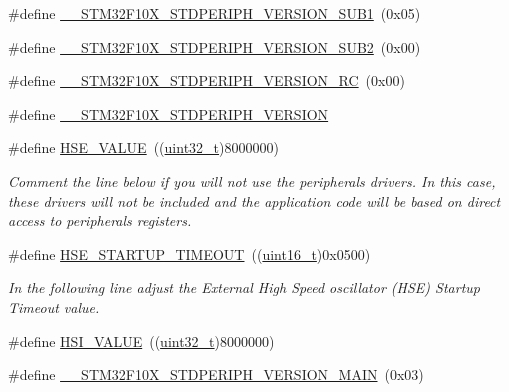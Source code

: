 \begin{DoxyCompactItemize}
\#define \hyperlink{group___library__configuration__section_ga7ce69a7c755b9d0551e9755d28612cb0}{\+\_\+\+\_\+\+S\+T\+M32\+F10\+X\+\_\+\+S\+T\+D\+P\+E\+R\+I\+P\+H\+\_\+\+V\+E\+R\+S\+I\+O\+N\+\_\+\+S\+U\+B1}~(0x05)
\item 
\#define \hyperlink{group___library__configuration__section_ga3ec41777ab08436b801c9c295248a6c7}{\+\_\+\+\_\+\+S\+T\+M32\+F10\+X\+\_\+\+S\+T\+D\+P\+E\+R\+I\+P\+H\+\_\+\+V\+E\+R\+S\+I\+O\+N\+\_\+\+S\+U\+B2}~(0x00)
\item 
\#define \hyperlink{group___library__configuration__section_gae0abedef178fde6294fdfd3401ef6e2c}{\+\_\+\+\_\+\+S\+T\+M32\+F10\+X\+\_\+\+S\+T\+D\+P\+E\+R\+I\+P\+H\+\_\+\+V\+E\+R\+S\+I\+O\+N\+\_\+\+RC}~(0x00)
\item 
\#define \hyperlink{group___library__configuration__section_gafb19c8675ea01accc2f8e5f467827328}{\+\_\+\+\_\+\+S\+T\+M32\+F10\+X\+\_\+\+S\+T\+D\+P\+E\+R\+I\+P\+H\+\_\+\+V\+E\+R\+S\+I\+ON}
\item 
\#define \hyperlink{group___library__configuration__section_gaeafcff4f57440c60e64812dddd13e7cb}{H\+S\+E\+\_\+\+V\+A\+L\+UE}~((\hyperlink{_p_e___types_8h_a33594304e786b158f3fb30289278f5af}{uint32\+\_\+t})8000000)
\begin{DoxyCompactList}\small\item\em Comment the line below if you will not use the peripherals drivers. In this case, these drivers will not be included and the application code will be based on direct access to peripherals registers. \end{DoxyCompactList}\item 
\#define \hyperlink{group___library__configuration__section_ga68ecbc9b0a1a40a1ec9d18d5e9747c4f}{H\+S\+E\+\_\+\+S\+T\+A\+R\+T\+U\+P\+\_\+\+T\+I\+M\+E\+O\+UT}~((\hyperlink{_p_e___types_8h_a1f1825b69244eb3ad2c7165ddc99c956}{uint16\+\_\+t})0x0500)
\begin{DoxyCompactList}\small\item\em In the following line adjust the External High Speed oscillator (H\+SE) Startup Timeout value. \end{DoxyCompactList}\item 
\#define \hyperlink{group___library__configuration__section_gaaa8c76e274d0f6dd2cefb5d0b17fbc37}{H\+S\+I\+\_\+\+V\+A\+L\+UE}~((\hyperlink{_p_e___types_8h_a33594304e786b158f3fb30289278f5af}{uint32\+\_\+t})8000000)
\item 
\#define \hyperlink{group___library__configuration__section_ga4c236abf68876febcb304f05ed3bafac}{\+\_\+\+\_\+\+S\+T\+M32\+F10\+X\+\_\+\+S\+T\+D\+P\+E\+R\+I\+P\+H\+\_\+\+V\+E\+R\+S\+I\+O\+N\+\_\+\+M\+A\+IN}~(0x03)

\end{DoxyCompactItemize}
